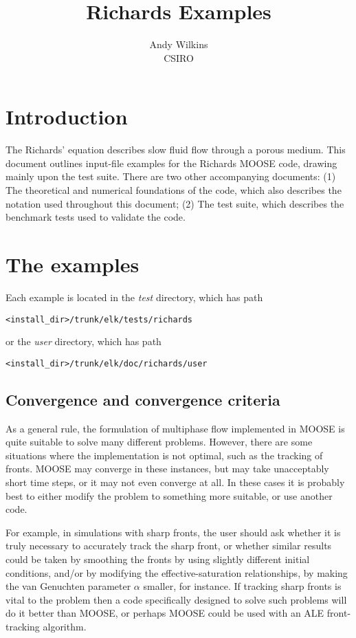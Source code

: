 \documentclass[]{scrreprt}
\begin{document}
\title{Richards Examples}
\author{Andy Wilkins \\
CSIRO}
\maketitle

\tableofcontents

\chapter{Introduction}

The Richards' equation describes slow fluid flow through a porous
medium.  This document outlines input-file examples for the Richards
MOOSE code, drawing mainly upon the test suite.  There are two other
accompanying documents: (1) The theoretical and numerical foundations
of the code, which also describes the notation used throughout this
document; (2) The test suite, which describes the benchmark tests used
to validate the code.


\chapter{The examples}

Each example is located in the {\em test} directory, which has path
\begin{verbatim}
<install_dir>/trunk/elk/tests/richards
\end{verbatim}
or the {\em user} directory, which has path
\begin{verbatim}
<install_dir>/trunk/elk/doc/richards/user
\end{verbatim}

\section{Convergence and convergence criteria}

As a general rule, the formulation of multiphase flow implemented in
MOOSE is quite suitable to solve many different problems.  However,
there are some situations where the implementation is not optimal,
such as the tracking of fronts.  MOOSE may converge in these
instances, but may take unacceptably short time steps, or it may not
even converge at all.  In these cases it is probably best to either
modify the problem to something more suitable, or use another code.

For example, in simulations with sharp fronts, the user should ask
whether it is truly necessary to accurately track the sharp front, or
whether similar results could be taken by smoothing the fronts by
using slightly different initial conditions, and/or by modifying the
effective-saturation relationships, by making the van Genuchten
parameter $\alpha$ smaller, for instance.  If tracking sharp fronts is
vital to the problem then a code specifically designed to solve such
problems will do it better than MOOSE, or perhaps MOOSE could be used
with an ALE front-tracking algorithm.
\end{document}
